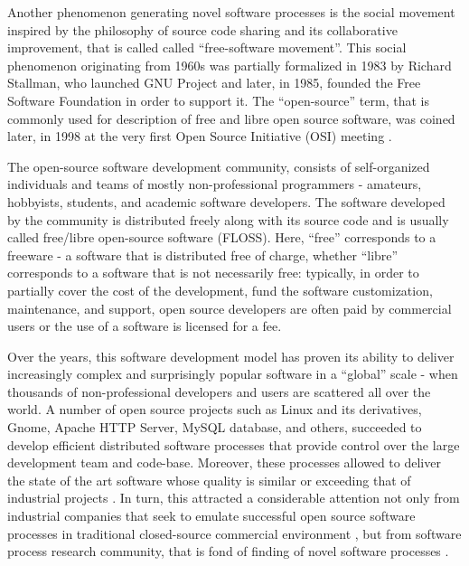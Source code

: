 Another phenomenon generating novel software processes is the social movement inspired by the philosophy 
of source code sharing and its collaborative improvement, that is called called ``free-software movement''. 
This social phenomenon originating from 1960s was partially formalized in 1983 by Richard Stallman,
who launched GNU Project and later, in 1985, founded the Free Software Foundation in order to support 
it. The ``open-source'' term, that is commonly used for description of free and libre open source software, 
was coined later, in 1998 at the very first Open Source Initiative (OSI) meeting \cite{osi-history}.

The open-source software development community, consists of self-organized individuals and teams of 
mostly non-professional programmers - amateurs, hobbyists, students, and academic software developers. 
The software developed by the community is distributed freely along with its source code and is 
usually called free/libre open-source software (FLOSS). Here, ``free'' corresponds to a freeware - 
a software that is distributed free of charge, whether ``libre'' corresponds to a software that is 
not necessarily free: typically, in order to partially cover the cost of the development, 
fund the software customization, maintenance, and support, open source developers are often paid 
by commercial users or the use of a software is licensed for a fee.

Over the years, this software development model has proven its ability to deliver increasingly complex 
and surprisingly popular software in a ``global'' scale - when thousands of non-professional developers 
and users are scattered all over the world. A number of open source projects such as Linux and its 
derivatives, Gnome, Apache HTTP Server, MySQL database, and others, succeeded to develop efficient 
distributed software processes that provide control over the large development team and code-base.
Moreover, these processes allowed to deliver the state of the art software whose quality is similar 
or exceeding that of industrial projects \cite{coverity2012}. 
In turn, this attracted a considerable attention not only from industrial companies that seek to emulate 
successful open source software processes in traditional closed-source commercial environment 
\cite{oss_virtual_organizations} \cite{oss_balance} \cite{oss_hp} \cite{oss_4industry}, 
but from software process research community, that is fond of finding of novel software processes
\cite{citeulike:12550640} \cite{citeulike:5043664} \cite{citeulike:5128808} \cite{citeulike:10377366}.

